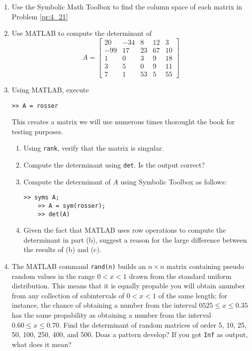 \documentclass[../main.tex]{subfiles}
\begin{document}
\begin{enumerate}[label=\textbf{\thechapter.\arabic{*}}, resume ]
  \item \label{pr:4_24} Use the Symbolic Math Toolbox to find the column space of each matrix in Problem \ref{pr:4_21}
  \item \label{pr:4_25} Use MATLAB to compute the determinant of
  \begin{equation*}
    A = \begin{bmatrix}
      20 & -34 & 8 & 12 & 3\\
      -99 & 17 & 23 & 67 & 10\\
      1 & 0 & 3 & 9 & 18\\
      3 & 5 & 0 & 9 & 11\\
      7 & 1 & 53 & 5 & 55
    \end{bmatrix}
  \end{equation*}
  
  \item \label{pr:4_26} Using MATLAB, execute\begin{lstlisting}[numbers=none,frame=none]
>> A = rosser
  \end{lstlisting}
  This creates a matrix we will use numerous times thorought the book for testing purposes.
  \begin{enumerate}[leftmargin=*, label=\textbf{\alph{*}.}]
    \item Using \texttt{rank}, verify that the matrix is singular.
    \item Compute the determinant using \texttt{det}. Is the output correct?
    \item Compute the determinant of \(A\) using Symbolic Toolbox as follows:\begin{lstlisting}[numbers=none,frame=none]
	>> syms A;
	>> A = sym(rosser);
	>> det(A)
    \end{lstlisting}
    
    \item Given the fact that MATLAB uses row operations to compute the determinant in part (b), suggest a reason for the large difference between the results of (b) and (c).
  \end{enumerate}
  
  \item \label{pr:4_27} The MATLAB command \texttt{rand(n)} builds an \(n \times n\) matrix containing pseudo random values in the range \(0 < x < 1\) drawn from the standard  uniform distribution. This means that it is equally propable you will obtain anumber from any collection of subintervals of \(0 < x < 1\) of the same length; for instance, the chance of obtaining a number from the interval \(0525 \leq x \leq 0.35\) has the same propability as obtaining a number from the interval \(0.60 \leq x \leq 0.70\). Find the determinant of random matrices of order 5, 10, 25, 50, 100, 250, 400, and 500. Doas a pattern develop? If you got \texttt{Inf} as output, what does it mean?
  

\end{enumerate}
\end{document}

